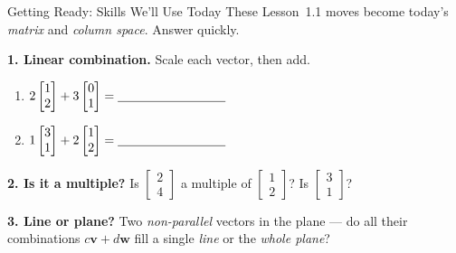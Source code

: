 \documentclass[10pt]{article}
\newcommand{\vv}{\mathbf{v}}
\newcommand{\ww}{\mathbf{w}}
\begin{document}

\vspace{0.12in}

\begin{notesbox}{Getting Ready: Skills We'll Use Today}
\small These Lesson~1.1 moves become today's \emph{matrix} and \emph{column space}. Answer quickly.

\vspace{4pt}
\textbf{1. Linear combination.} Scale each vector, then add.
\begin{enumerate}[label=(\alph*), leftmargin=2.0em, itemsep=10pt]
  \item $2\begin{bmatrix} 1 \\ 2 \end{bmatrix} + 3\begin{bmatrix} 0 \\ 1 \end{bmatrix}
        = \blank{3.0cm}$
  \item $1\begin{bmatrix} 3 \\ 1 \end{bmatrix} + 2\begin{bmatrix} 1 \\ 2 \end{bmatrix}
        = \blank{3.0cm}$
\end{enumerate}

\vspace{8pt}
\textbf{2. Is it a multiple?} Is $\begin{bmatrix} 2 \\ 4 \end{bmatrix}$ a multiple of
$\begin{bmatrix} 1 \\ 2 \end{bmatrix}$? Is $\begin{bmatrix} 3 \\ 1 \end{bmatrix}$? \writeline

\vspace{6pt}
\textbf{3. Line or plane?} Two \emph{non-parallel} vectors in the plane --- do all their
combinations $c\vv+d\ww$ fill a single \emph{line} or the \emph{whole plane}? \writeline
\end{notesbox}
\end{document}
